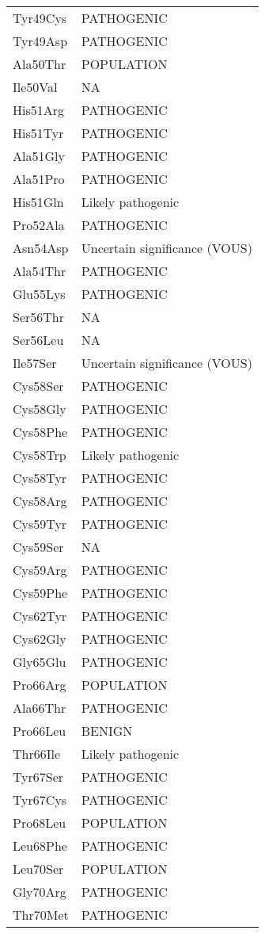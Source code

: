 \begin{longtable}[l]{l|l}
	Tyr49Cys & PATHOGENIC \\
	Tyr49Asp & PATHOGENIC \\
	Ala50Thr & POPULATION \\
	Ile50Val & NA \\
	His51Arg & PATHOGENIC \\
	His51Tyr & PATHOGENIC \\
	Ala51Gly & PATHOGENIC \\
	Ala51Pro & PATHOGENIC \\
	His51Gln & Likely pathogenic \\
	Pro52Ala & PATHOGENIC \\
	Asn54Asp & Uncertain significance (VOUS) \\
	Ala54Thr & PATHOGENIC \\
	Glu55Lys & PATHOGENIC \\
	Ser56Thr & NA \\
	Ser56Leu & NA \\
	Ile57Ser & Uncertain significance (VOUS) \\
	Cys58Ser & PATHOGENIC \\
	Cys58Gly & PATHOGENIC \\
	Cys58Phe & PATHOGENIC \\
	Cys58Trp & Likely pathogenic \\
	Cys58Tyr & PATHOGENIC \\
	Cys58Arg & PATHOGENIC \\
	Cys59Tyr & PATHOGENIC \\
	Cys59Ser & NA \\
	Cys59Arg & PATHOGENIC \\
	Cys59Phe & PATHOGENIC \\
	Cys62Tyr & PATHOGENIC \\
	Cys62Gly & PATHOGENIC \\
	Gly65Glu & PATHOGENIC \\
	Pro66Arg & POPULATION \\
	Ala66Thr & PATHOGENIC \\
	Pro66Leu & BENIGN \\
	Thr66Ile & Likely pathogenic \\
	Tyr67Ser & PATHOGENIC \\
	Tyr67Cys & PATHOGENIC \\
	Pro68Leu & POPULATION \\
	Leu68Phe & PATHOGENIC \\
	Leu70Ser & POPULATION \\
	Gly70Arg & PATHOGENIC \\
	Thr70Met & PATHOGENIC \\

\end{longtable}
